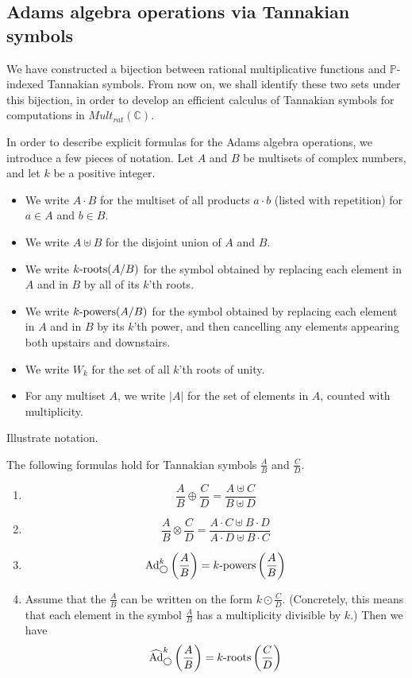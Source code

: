 \subsection{Adams algebra operations via Tannakian symbols}

We have constructed a bijection between rational multiplicative functions and $\mathbb{P}$-indexed Tannakian symbols. From now on, we shall identify these two sets under this bijection, in order to develop an efficient calculus of Tannakian symbols for computations in $Mult_{rat}(\mathbb{C})$.

In order to describe explicit formulas for the Adams algebra operations, we introduce a few pieces of notation. Let $A$ and $B$ be multisets of complex numbers, and let $k$ be a positive integer.

\begin{itemize}
\item We write $A \cdot B$ for the multiset of all products $a \cdot b$ (listed with repetition) for $a \in A$ and $b \in B$.
\item We write $A \uplus B $ for the disjoint union of $A$ and $B$.
\item We write ${k}\text{-roots}(A/B)$ for the symbol obtained by replacing each element in $A$ and in $B$ by all of its $k$'th roots.
\item We write ${k}\text{-powers}(A/B)$ for the symbol obtained by replacing each element in $A$ and in $B$ by its $k$'th power, and then cancelling any elements appearing both upstairs and downstairs.
\item We write $W_k$ for the set of all $k$'th roots of unity.
\item For any multiset $A$, we write $\vert A \vert$ for the set of elements in $A$, counted with multiplicity.
\end{itemize}

\begin{example}
Illustrate notation.
\end{example}

\begin{theorem}
The following formulas hold for Tannakian symbols $\frac{A}{B}$ and $\frac{C}{D}$.
\begin{enumerate}
\item $$\frac{A}{B} \oplus \frac{C}{D} = \frac{A \uplus C}{B \uplus D}$$
\item $$\frac{A}{B} \otimes \frac{C}{D} = \frac{ A \cdot C \uplus B \cdot D }{ A \cdot D \uplus B \cdot C }$$
\item $$\text{Ad}^{k}_{\bigcirc} \left(\frac{A}{B} \right) = {k}\text{-powers} \left(\frac{A}{B} \right)$$
\item Assume that the $\frac{A}{B}$ can be written on the form $k \odot \frac{C}{D}$. (Concretely, this means that each element in the symbol $\frac{A}{B}$ has a multiplicity divisible by $k$.) Then we have
$$ \widehat{\text{Ad}}^{k}_{\bigcirc}\left(\frac{A}{B}\right) = {k}\text{-roots} \left( \frac{C}{D} \right)  $$
\end{enumerate}
\end{theorem}

